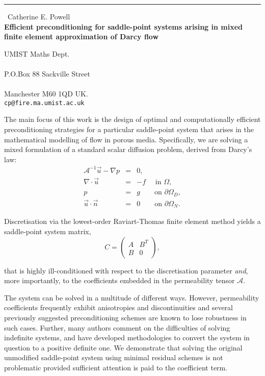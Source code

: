 \documentclass{report}
\begin{document}
\begin{center}
\rule{6in}{1pt} \
{\large Catherine E. Powell \\
{\bf Efficient preconditioning for saddle-point systems arising in mixed finite element approximation of Darcy flow}}

UMIST Maths Dept. \\  \\ P.O.Box 88 Sackville Street \\ \\ Manchester M60 1QD UK.
\\
{\tt cp@fire.ma.umist.ac.uk}\end{center}

The main focus of this work is the design of optimal and
computationally efficient preconditioning strategies for a particular
saddle-point system that arises in the mathematical modelling of flow in
porous media. Specifically, we are solving a mixed formulation of a
standard scalar diffusion problem, derived from Darcy's law:
\begin{equation}
\nonumber
\begin{array}{rcl}
\mathcal{A}^{-1}\vec {u}-\nabla p &= & 0,\\
\nabla \cdot \vec {u} &=& -f \quad \, \, \mbox{in } \Omega,\\
p &=& g
\quad\quad \mbox{on } \partial\Omega_{D},\\
\vec {u}\cdot\vec {n} &=& 0
\quad\quad \mbox{on } \partial\Omega_{N}.
\end{array}
\end{equation}

\noindent
Discretisation via the lowest-order Raviart-Thomas finite
element method yields a saddle-point system matrix,
$$ C = \left(\begin{array}{cc} A & B^{T} \\ B & 0
\end{array}\right),$$

\noindent that is highly ill-conditioned with respect to the
discretisation parameter \textit{and}, more importantly, to the
coefficients embedded in the permeability tensor $\mathcal{A}.$

The system can be solved in a multitude of different ways. However,
permeability coefficients frequently exhibit anisotropies and
discontinuities and several previously suggested preconditioning schemes
are known to lose robustness in such cases. Further, many authors comment
on the difficulties of solving indefinite systems, and have developed
methodologies to convert the system in question to a positive definite
one. We demonstrate that solving the original unmodified saddle-point
system using minimal residual schemes is not problematic provided
sufficient attention is paid to the coefficient term.
\end{document}
